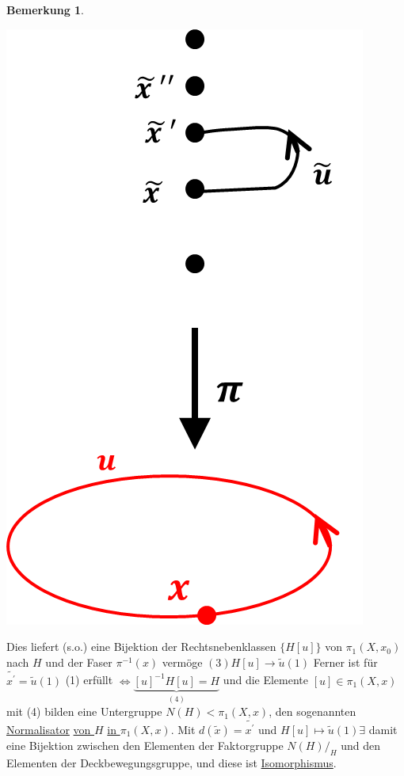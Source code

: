 \documentclass[a4paper,11pt,notitlepage]{report}
\theoremstyle{definition}
\newtheorem{remark}{Bemerkung}[chapter]
\begin{document}
\begin{remark}
\begin{center}
	 	\includegraphics[scale=0.5]{images/2011_12_22_Bild7.png}
	 \end{center}
	Dies liefert (s.o.) eine Bijektion der Rechtsnebenklassen $\{H[u]\}$ von $\pi_1(X,x_0)$ nach $H$ und der Faser $\pi^{-1}(x)$ vermöge $(3) \boxed{H[u] \rightarrow \widetilde{u}(1)}$ \newline
	Ferner ist für $\widetilde{x^\prime} = \widetilde{u}(1)$ (1) erfüllt $\Leftrightarrow \underbrace{[u]^{-1}H[u]=H}_{(4)}$ und die Elemente $[u] \in \pi_1(X,x)$ mit (4) bilden eine Untergruppe $N(H) < \pi_1(X,x)$, den sogenannten \underline{Normalisator} \underline{von $H$} \underline{in $\pi_1(X,x)$}. Mit $d(\widetilde{x}) = \widetilde{x^\prime}$ und $H[u] \mapsto \widetilde{u}(1) \exists$ damit eine Bijektion zwischen den Elementen der Faktorgruppe $N(H)/_H$ und den Elementen der Deckbewegungsgruppe, und diese ist \underline{Isomorphismus}.
\end{remark}
\end{document}
